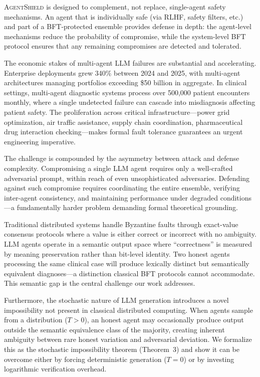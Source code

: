 \documentclass[journal,10pt]{IEEEtran}
\begin{document}
\textsc{AgentShield} is designed to complement, not replace, single-agent safety mechanisms. An agent that is individually safe (via RLHF, safety filters, etc.) and part of a BFT-protected ensemble provides defense in depth: the agent-level mechanisms reduce the probability of compromise, while the system-level BFT protocol ensures that any remaining compromises are detected and tolerated.

The economic stakes of multi-agent LLM failures are substantial and accelerating. Enterprise deployments grew 340\% between 2024 and 2025, with multi-agent architectures managing portfolios exceeding \$50 billion in aggregate. In clinical settings, multi-agent diagnostic systems process over 500{,}000 patient encounters monthly, where a single undetected failure can cascade into misdiagnosis affecting patient safety. The proliferation across critical infrastructure---power grid optimization, air traffic assistance, supply chain coordination, pharmaceutical drug interaction checking---makes formal fault tolerance guarantees an urgent engineering imperative.

The challenge is compounded by the asymmetry between attack and defense complexity. Compromising a single LLM agent requires only a well-crafted adversarial prompt, within reach of even unsophisticated adversaries. Defending against such compromise requires coordinating the entire ensemble, verifying inter-agent consistency, and maintaining performance under degraded conditions---a fundamentally harder problem demanding formal theoretical grounding.

Traditional distributed systems handle Byzantine faults through exact-value consensus protocols where a value is either correct or incorrect with no ambiguity. LLM agents operate in a semantic output space where ``correctness'' is measured by meaning preservation rather than bit-level identity. Two honest agents processing the same clinical case will produce lexically distinct but semantically equivalent diagnoses---a distinction classical BFT protocols cannot accommodate. This semantic gap is the central challenge our work addresses.

Furthermore, the stochastic nature of LLM generation introduces a novel impossibility not present in classical distributed computing. When agents sample from a distribution ($T > 0$), an honest agent may occasionally produce output outside the semantic equivalence class of the majority, creating inherent ambiguity between rare honest variation and adversarial deviation. We formalize this as the stochastic impossibility theorem (Theorem~3) and show it can be overcome either by forcing deterministic generation ($T=0$) or by investing logarithmic verification overhead.
\end{document}
